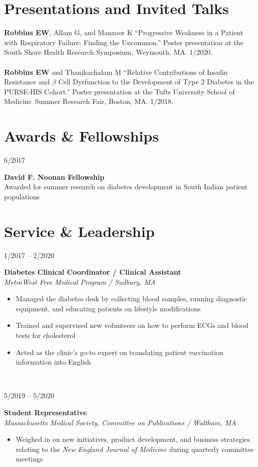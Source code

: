 \documentclass{book}
\newcommand\colleft{.20}
\newcommand\colright{.75}
\newcommand{\entryfour}[4]
	{
		\begin{minipage}[t]{\colleft\textwidth}
		\hfill \textsc{#1}
		\end{minipage}
		\hfill\vline\hfill
		\begin{minipage}[t]{\colright\textwidth}
		{\bf#2}\\
		\textit{#3}
		\footnotesize{#4}
		\end{minipage}\\
		\entryvspace
	}%
\newcommand{\entrythree}[3]
{
	\begin{minipage}[t]{\colleft\textwidth}
		\hfill \textsc{#1}
	\end{minipage}
	\hfill\vline\hfill
	\begin{minipage}[t]{\colright\textwidth}
		{\bf#2}\\
		\footnotesize{#3}
	\end{minipage}
	\entryvspace
}%
\newcommand{\entryvspace}{\vspace{0.5em}}
\newcommand{\medschool}{Tufts University School of Medicine}
\begin{document}
  \section*{Presentations and Invited Talks}
	\textbf{Robbins EW}, Allam G, and Manzoor K ``Progressive Weakness in a Patient with Respiratory Failure: Finding the Uncommon.'' Poster presentation at the South Shore Health Research Symposium, Weymouth, MA. 1/2020.
	\\ \\
	\textbf{Robbins EW} and Thanikachalam M ``Relative Contributions of Insulin Resistance and $\beta$ Cell Dysfunction to the Development of Type 2 Diabetes in the PURSE-HIS Cohort.'' Poster presentation at the \medschool \ Summer Research Fair, Boston, MA. 1/2018.
	
	\section*{Awards \& Fellowships}
		
		\entrythree{6/2017}{David F. Noonan Fellowship}{Awarded for summer research on diabetes development in South Indian patient populations}
	\section*{Service \& Leadership}
	\entryfour{1/2017 -- 2/2020}{Diabetes Clinical Coordinator / Clinical Assistant}{MetroWest Free Medical Program / Sudbury, MA}{%
	\begin{itemize}
		\item Managed the diabetes desk by collecting blood samples, running diagnostic equipment, and educating patients on lifestyle modifications
		\item Trained and supervised new volunteers on how to perform ECGs and blood tests for cholesterol 
		\item Acted as the clinic's go-to expert on translating patient vaccination information into English
	\end{itemize}
	}

	\entryfour{5/2019 -- 5/2020}{Student Representative}{Massachusetts Medical Society, Committee on Publications / Waltham, MA}{%
		\begin{itemize}
			\item Weighed in on new initiatives, product development, and business strategies relating to the \emph{New England Journal of Medicine} during quarterly committee meetings
		\end{itemize}
	}
\end{document}
